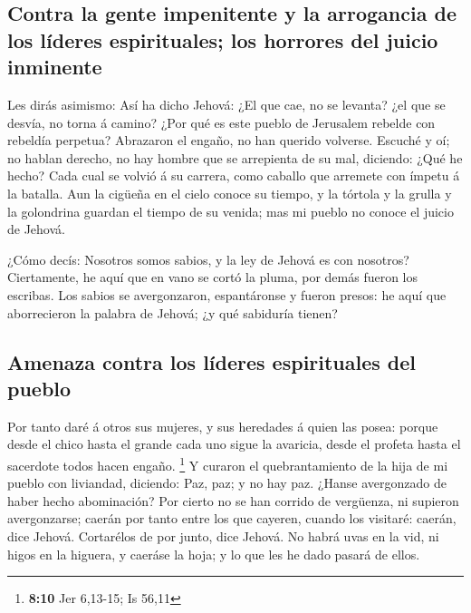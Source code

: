 \hypertarget{contra-la-gente-impenitente-y-la-arrogancia-de-los-luxedderes-espirituales-los-horrores-del-juicio-inminente}{%
\subsection{Contra la gente impenitente y la arrogancia de los líderes
espirituales; los horrores del juicio
inminente}\label{contra-la-gente-impenitente-y-la-arrogancia-de-los-luxedderes-espirituales-los-horrores-del-juicio-inminente}}

 Les dirás asimismo: Así ha dicho Jehová: ¿El que cae, no
se levanta? ¿el que se desvía, no torna á camino?  ¿Por
qué es este pueblo de Jerusalem rebelde con rebeldía perpetua? Abrazaron
el engaño, no han querido volverse.  Escuché y oí; no
hablan derecho, no hay hombre que se arrepienta de su mal, diciendo:
¿Qué he hecho? Cada cual se volvió á su carrera, como caballo que
arremete con ímpetu á la batalla.  Aun la cigüeña en el
cielo conoce su tiempo, y la tórtola y la grulla y la golondrina guardan
el tiempo de su venida; mas mi pueblo no conoce el juicio de Jehová.

 ¿Cómo decís: Nosotros somos sabios, y la ley de Jehová es
con nosotros? Ciertamente, he aquí que en vano se cortó la pluma, por
demás fueron los escribas.  Los sabios se avergonzaron,
espantáronse y fueron presos: he aquí que aborrecieron la palabra de
Jehová; ¿y qué sabiduría tienen?

\hypertarget{amenaza-contra-los-luxedderes-espirituales-del-pueblo}{%
\subsection{Amenaza contra los líderes espirituales del
pueblo}\label{amenaza-contra-los-luxedderes-espirituales-del-pueblo}}

 Por tanto daré á otros sus mujeres, y sus heredades á
quien las posea: porque desde el chico hasta el grande cada uno sigue la
avaricia, desde el profeta hasta el sacerdote todos hacen engaño.
\footnote{\textbf{8:10} Jer 6,13-15; Is 56,11}  Y curaron
el quebrantamiento de la hija de mi pueblo con liviandad, diciendo: Paz,
paz; y no hay paz.  ¿Hanse avergonzado de haber hecho
abominación? Por cierto no se han corrido de vergüenza, ni supieron
avergonzarse; caerán por tanto entre los que cayeren, cuando los
visitaré: caerán, dice Jehová.  Cortarélos de por junto,
dice Jehová. No habrá uvas en la vid, ni higos en la higuera, y caeráse
la hoja; y lo que les he dado pasará de ellos.

